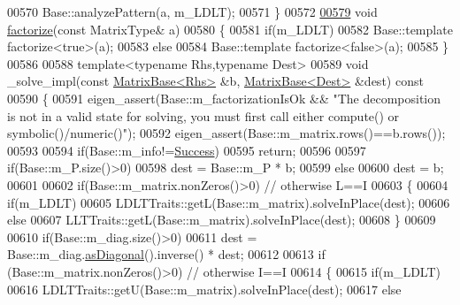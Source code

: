 \begin{DoxyCode}
00570       Base::analyzePattern(a, m\_LDLT);
00571     \}
00572 
\hyperlink{group___sparse_cholesky___module_ab1b21d430cc2a8e332221313a4f2f2e3}{00579}     \textcolor{keywordtype}{void} \hyperlink{group___sparse_cholesky___module_ab1b21d430cc2a8e332221313a4f2f2e3}{factorize}(\textcolor{keyword}{const} MatrixType& a)
00580     \{
00581       \textcolor{keywordflow}{if}(m\_LDLT)
00582         Base::template factorize<true>(a);
00583       \textcolor{keywordflow}{else}
00584         Base::template factorize<false>(a);
00585     \}
00586 
00588     \textcolor{keyword}{template}<\textcolor{keyword}{typename} Rhs,\textcolor{keyword}{typename} Dest>
00589     \textcolor{keywordtype}{void} \_solve\_impl(\textcolor{keyword}{const} \hyperlink{group___core___module_class_eigen_1_1_matrix_base}{MatrixBase<Rhs>} &b, \hyperlink{group___core___module_class_eigen_1_1_matrix_base}{MatrixBase<Dest>} &dest)\textcolor{keyword}{ const}
00590 \textcolor{keyword}{    }\{
00591       eigen\_assert(Base::m\_factorizationIsOk && \textcolor{stringliteral}{"The decomposition is not in a valid state for solving, you
       must first call either compute() or symbolic()/numeric()"});
00592       eigen\_assert(Base::m\_matrix.rows()==b.rows());
00593 
00594       \textcolor{keywordflow}{if}(Base::m\_info!=\hyperlink{group__enums_gga85fad7b87587764e5cf6b513a9e0ee5ea52581b035f4b59c203b8ff999ef5fcea}{Success})
00595         \textcolor{keywordflow}{return};
00596 
00597       \textcolor{keywordflow}{if}(Base::m\_P.size()>0)
00598         dest = Base::m\_P * b;
00599       \textcolor{keywordflow}{else}
00600         dest = b;
00601 
00602       \textcolor{keywordflow}{if}(Base::m\_matrix.nonZeros()>0) \textcolor{comment}{// otherwise L==I}
00603       \{
00604         \textcolor{keywordflow}{if}(m\_LDLT)
00605           LDLTTraits::getL(Base::m\_matrix).solveInPlace(dest);
00606         \textcolor{keywordflow}{else}
00607           LLTTraits::getL(Base::m\_matrix).solveInPlace(dest);
00608       \}
00609 
00610       \textcolor{keywordflow}{if}(Base::m\_diag.size()>0)
00611         dest = Base::m\_diag.\hyperlink{group___core___module_a14235b62c90f93fe910070b4743782d0}{asDiagonal}().inverse() * dest;
00612 
00613       \textcolor{keywordflow}{if} (Base::m\_matrix.nonZeros()>0) \textcolor{comment}{// otherwise I==I}
00614       \{
00615         \textcolor{keywordflow}{if}(m\_LDLT)
00616           LDLTTraits::getU(Base::m\_matrix).solveInPlace(dest);
00617         \textcolor{keywordflow}{else}

\end{DoxyCode}
